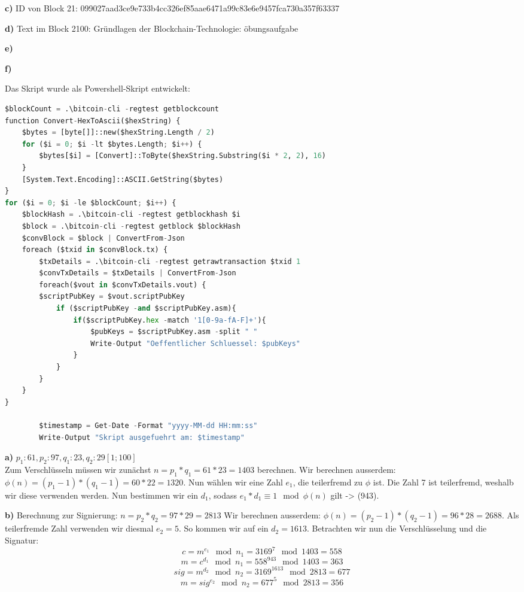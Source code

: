 \documentclass[german]{../uebung}
\begin{document}
\begin{exercise}{1}
    \textbf{c)}
    ID von Block 21: 099027aad3ce9e733b4cc326ef85aae6471a99c83e6e9457fca730a357f63337

    \textbf{d)}
    Text im Block 2100: Gründlagen der Blockchain-Technologie: öbungsaufgabe

    \textbf{e)}

    \textbf{f)}

    Das Skript wurde als Powershell-Skript entwickelt:
    \begin{lstlisting}[language=Python]
$blockCount = .\bitcoin-cli -regtest getblockcount
function Convert-HexToAscii($hexString) {
    $bytes = [byte[]]::new($hexString.Length / 2)
    for ($i = 0; $i -lt $bytes.Length; $i++) {
        $bytes[$i] = [Convert]::ToByte($hexString.Substring($i * 2, 2), 16)
    }
    [System.Text.Encoding]::ASCII.GetString($bytes)
}
for ($i = 0; $i -le $blockCount; $i++) {
    $blockHash = .\bitcoin-cli -regtest getblockhash $i
    $block = .\bitcoin-cli -regtest getblock $blockHash
    $convBlock = $block | ConvertFrom-Json
    foreach ($txid in $convBlock.tx) {
        $txDetails = .\bitcoin-cli -regtest getrawtransaction $txid 1
        $convTxDetails = $txDetails | ConvertFrom-Json
        foreach($vout in $convTxDetails.vout) {
        $scriptPubKey = $vout.scriptPubKey
            if ($scriptPubKey -and $scriptPubKey.asm){
                if($scriptPubKey.hex -match '1[0-9a-fA-F]+'){
                    $pubKeys = $scriptPubKey.asm -split " "
                    Write-Output "Oeffentlicher Schluessel: $pubKeys"
                }
            }
        }
    }
}

        $timestamp = Get-Date -Format "yyyy-MM-dd HH:mm:ss"
        Write-Output "Skript ausgefuehrt am: $timestamp"


    \end{lstlisting}

\end{exercise}

\begin{exercise}{2}

    \textbf{a)}
    \(p_1: 61, p_2: 97, q_1: 23, q_2: 29 [1; 100]\)\\
    Zum Verschlüsseln müssen wir zunächst \(n=p_1*q_1=61*23=1403\) berechnen.
    Wir berechnen ausserdem: \(\phi(n)=(p_1-1)*(q_1-1)=60*22=1320\).
    Nun wählen wir eine Zahl \(e_1\), die teilerfremd zu \(\phi\) ist. Die Zahl 7 ist teilerfremd, weshalb wir diese verwenden werden.
    Nun bestimmen wir ein \(d_1\), sodass \(e_1*d_1 \equiv 1 \mod \phi(n) \) gilt -> (943).

    \textbf{b)}
    Berechnung zur Signierung: \(n=p_2*q_2=97*29=2813\)
    Wir berechnen ausserdem: \(\phi(n)=(p_2-1)*(q_2-1)=96*28=2688\). Als teilerfremde Zahl verwenden wir diesmal \(e_2=5\). So kommen wir auf ein \(d_2=1613\). Betrachten wir nun die Verschlüsselung und die Signatur:
    \[c=m^{e_1} \mod n_1=3169^7 \mod 1403= 558\]
    \[m=c^{d_1} \mod n_1=558^{943} \mod 1403= 363\]
    \[sig=m^{d_2} \mod n_2=3169^{1613} \mod 2813= 677\]
    \[m=sig^{e_2} \mod n_2=677^5 \mod 2813= 356\]

\end{exercise}
\end{document}
